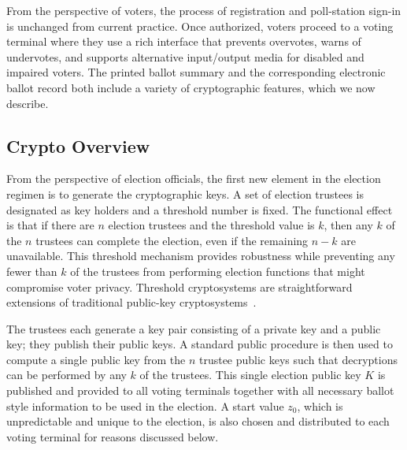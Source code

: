 \label{sec:design}

From the perspective of voters, the process of registration and poll-station sign-in is unchanged from current practice.  Once authorized, voters proceed to a voting terminal where they use a rich interface that prevents overvotes, warns of undervotes, and supports alternative input/output media for disabled and impaired voters. The printed ballot summary and the corresponding electronic ballot record both include a variety of cryptographic features, which we now describe.




\subsection{Crypto Overview}
From the perspective of election officials, the first new element in the election regimen is 
to generate the cryptographic keys.  
A set of election trustees is designated as key holders and a threshold number is fixed.  
The functional effect is that if there are $n$ election trustees and the threshold value is $k$, then any $k$ of the $n$ trustees can complete the election, even if the remaining $n-k$ are unavailable.  This threshold mechanism provides robustness while preventing any fewer than $k$ of the trustees from performing election functions that might compromise voter privacy. 
Threshold cryptosystems are straightforward extensions of traditional public-key cryptosystems~\cite{desmedt90threshold}.

The trustees each generate a key pair consisting of a private key and
a public key; they publish their public keys.  
A standard public
procedure is then used to compute a single public key from the $n$
trustee public keys such that decryptions can be performed by any $k$
of the trustees.  This single election public key $K$ is published and
provided to all voting terminals together with all necessary
ballot style information to be used in the election.  
A start value $z_0$, which is unpredictable and unique to the election,
is also chosen and distributed to each voting terminal for reasons discussed below.

